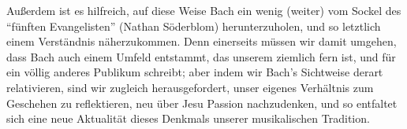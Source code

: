 \documentclass[a4paper,11pt,twoside]{scrartcl}
\begin{document}
Außerdem ist es hilfreich, auf diese Weise Bach ein wenig (weiter)
vom Sockel des \enquote{fünften Evangelisten} (Nathan
Söderblom\cite[S.~226]{thunberg}) herunterzuholen, und so letztlich einem
Verständnis näherzukommen.  Denn einerseits müssen wir damit umgehen,
dass Bach auch einem Umfeld entstammt, das unserem ziemlich fern ist,
und für ein völlig anderes Publikum schreibt; aber indem wir Bach’s
Sichtweise derart relativieren, sind wir zugleich herausgefordert, unser
eigenes Verhältnis zum Geschehen zu reflektieren, neu über Jesu Passion
nachzudenken, und so entfaltet sich eine neue Aktualität dieses Denkmals
unserer musikalischen Tradition.

\printbibliography
\end{document}
